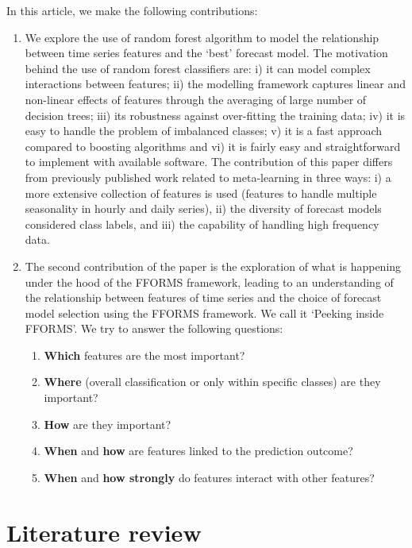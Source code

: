 \documentclass[11pt,a4paper,]{article}
\providecommand{\tightlist}{%
  \setlength{\itemsep}{0pt}\setlength{\parskip}{0pt}}
\begin{document}
In this article, we make the following contributions:

\begin{enumerate}
\def\labelenumi{\arabic{enumi}.}
\item
  We explore the use of random forest algorithm to model the relationship between time series features and the `best' forecast model. The motivation behind the use of random forest classifiers are: i) it can model complex interactions between features; ii) the modelling framework captures linear and non-linear effects of features through the averaging of large number of decision trees; iii) its robustness against over-fitting the training data; iv) it is easy to handle the problem of imbalanced classes; v) it is a fast approach compared to boosting algorithms and vi) it is fairly easy and straightforward to implement with available software. The contribution of this paper differs from previously published work related to meta-learning \autocites{prudencio2004meta}{lemke2010meta}{kuck2016meta} in three ways: i) a more extensive collection of features is used (features to handle multiple seasonality in hourly and daily series), ii) the diversity of forecast models considered class labels, and iii) the capability of handling high frequency data.
\item
  The second contribution of the paper is the exploration of what is happening under the hood of the FFORMS framework, leading to an understanding of the relationship between features of time series and the choice of forecast model selection using the FFORMS framework. We call it `Peeking inside FFORMS'. We try to answer the following questions:

  \begin{enumerate}
  \def\labelenumii{\roman{enumii})}
  \tightlist
  \item
    \textbf{Which} features are the most important?
  \item
    \textbf{Where} (overall classification or only within specific classes) are they important?
  \item
    \textbf{How} are they important?
  \item
    \textbf{When} and \textbf{how} are features linked to the prediction outcome?
  \item
    \textbf{When} and \textbf{how strongly} do features interact with other features?
  \end{enumerate}
\end{enumerate}

\hypertarget{litreview}{%
\section{Literature review}\label{litreview}}
\end{document}
